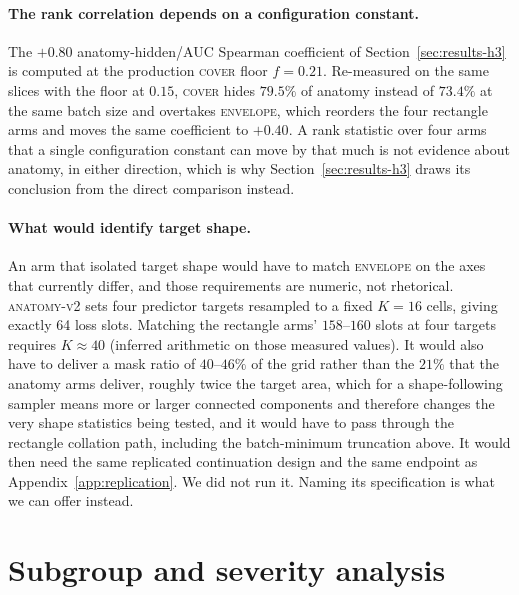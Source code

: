 \documentclass{article}
\begin{document}
\paragraph{The rank correlation depends on a configuration constant.} The
$+0.80$ anatomy-hidden/AUC Spearman coefficient of
Section~\ref{sec:results-h3} is computed at the production \textsc{cover} floor
$f{=}0.21$. Re-measured on the same slices with the floor at $0.15$,
\textsc{cover} hides $79.5\%$ of anatomy instead of $73.4\%$ at the same batch
size and overtakes
\textsc{envelope}, which reorders the four rectangle arms and moves the same
coefficient to $+0.40$. A rank statistic over four arms that a single
configuration constant can move by that much is not evidence about anatomy, in
either direction, which is why Section~\ref{sec:results-h3} draws its conclusion
from the direct comparison instead.

\paragraph{What would identify target shape.} An arm that isolated target shape
would have to match \textsc{envelope} on the axes that currently differ, and
those requirements are numeric, not rhetorical. \textsc{anatomy-v2} sets four
predictor targets resampled to a fixed $K{=}16$ cells, giving exactly 64 loss
slots. Matching the rectangle arms' $158$--$160$ slots at four targets requires
$K\approx40$ (inferred arithmetic on those measured values). It would also have
to deliver a mask ratio of $40$--$46\%$ of the grid rather than the $21\%$ that
the anatomy arms deliver, roughly twice the target area, which for a
shape-following sampler means more or larger connected components and therefore changes the
very shape statistics being tested, and it would have to pass through the
rectangle collation path, including the batch-minimum truncation above. It would
then need the same replicated continuation design and the same endpoint as
Appendix~\ref{app:replication}. We did not run it. Naming its specification is
what we can offer instead.

\section{Subgroup and severity analysis}
\label{app:subgroup}
\end{document}
